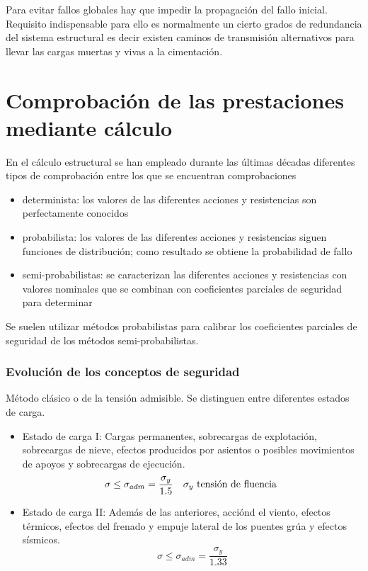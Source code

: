 Para evitar fallos globales hay que impedir la propagación del fallo inicial. Requisito indispensable para ello es normalmente un cierto grados de redundancia del sistema estructural es decir existen caminos de transmisión alternativos para llevar las cargas muertas y vivas a la cimentación.

\section{Comprobación de las prestaciones mediante cálculo}

En el cálculo estructural se han empleado durante las últimas décadas diferentes tipos de comprobación entre los que se encuentran comprobaciones
\begin{itemize}
    \item determinista: los valores de las diferentes acciones y resistencias son perfectamente conocidos
    \item probabilista: los valores de las diferentes acciones y resistencias siguen funciones de distribución; como resultado se obtiene la probabilidad de fallo
    \item semi-probabilistas: se caracterizan las diferentes acciones y resistencias con valores nominales que se combinan con coeficientes parciales de seguridad para determinar
\end{itemize}
Se suelen utilizar métodos probabilistas para calibrar los coeficientes parciales de seguridad de los métodos semi-probabilistas.

\subsubsection{Evolución de los conceptos de seguridad}
Método clásico o de la tensión admisible.
Se distinguen entre diferentes estados de carga.
\begin{itemize}
    \item Estado de carga I: Cargas permanentes, sobrecargas de explotación, sobrecargas de nieve, efectos producidos por asientos o posibles movimientos de apoyos y sobrecargas de ejecución.
    \[ \sigma \leq \sigma_{adm} = \frac{\sigma_y}{1.5} \quad \sigma_y \textup{ tensión de fluencia } \]
    \item Estado de carga II: Además de las anteriores, acciónd el viento, efectos térmicos, efectos del frenado y empuje lateral de los puentes grúa y efectos sísmicos.
    \[ \sigma \leq \sigma_{adm} = \frac{\sigma_y}{1.33} \]
\end{itemize}

